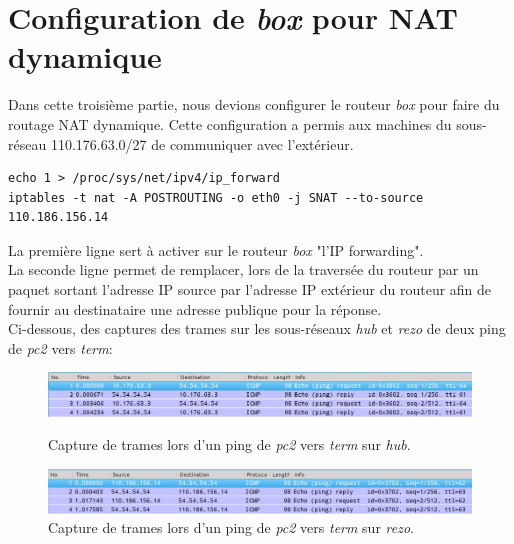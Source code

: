 \documentclass[12pt,a4paper,utf8x]{report}
\begin{document}
\section[NAT dynamique]{Configuration de \emph{box} pour NAT dynamique}
Dans cette troisième partie, nous devions configurer le routeur \emph{box} pour faire du routage NAT dynamique. Cette configuration a permis aux machines du sous-réseau 110.176.63.0/27 de communiquer avec l'extérieur.
\\
\begin{verbatim}
echo 1 > /proc/sys/net/ipv4/ip_forward
iptables -t nat -A POSTROUTING -o eth0 -j SNAT --to-source 110.186.156.14
\end{verbatim}
La première ligne sert à activer sur le routeur \emph{box} "l'IP forwarding".
\\
La seconde ligne permet de remplacer, lors de la traversée du routeur par un paquet sortant l'adresse IP source par l'adresse IP extérieur du routeur afin de fournir au destinataire une adresse publique pour la réponse.
\\
Ci-dessous, des captures des trames sur les sous-réseaux \emph{hub} et \emph{rezo} de deux ping de \emph{pc2} vers \emph{term}:

\begin{figure}[h!]
\centering
\includegraphics[width=1\textwidth]{PingHub.png}
\caption{Capture de trames lors d'un ping de \emph{pc2} vers \emph{term} sur \emph{hub}.}
\vspace{1cm}
\includegraphics[width=1\textwidth]{PingRezo.png}
\caption{Capture de trames lors d'un ping de \emph{pc2} vers \emph{term} sur \emph{rezo}.}
\end{figure}
\end{document}
